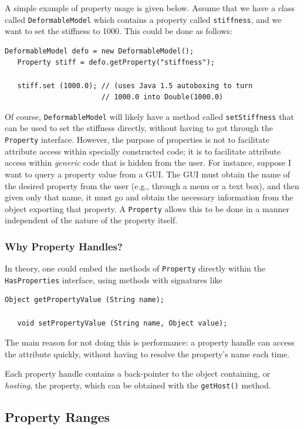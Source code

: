 \documentclass{article}
\begin{document}
A simple example of property usage is given below. Assume that we have
a class called {\tt DeformableModel} which contains a property called
{\tt stiffness}, and we want to set the stiffness to 1000. This
could be done as follows:
\begin{lstlisting}[]
   DeformableModel defo = new DeformableModel();    
   Property stiff = defo.getProperty("stiffness");

   stiff.set (1000.0); // (uses Java 1.5 autoboxing to turn
                       // 1000.0 into Double(1000.0)
\end{lstlisting}
Of course, {\tt DeformableModel} will likely have a method called
{\tt setStiffness} that can be used to set the stiffness directly, without
having to got through the {\tt Property} interface.  However, the
purpose of properties is not to facilitate attribute access within
specially constructed code; it is to facilitate attribute access
within {\it generic} code that is hidden from the user. For instance,
suppose I want to query a property value from a GUI. The GUI must
obtain the name of the desired property from the user (e.g., through a
menu or a text box), and then given only that name, it must go and
obtain the necessary information from the object exporting that
property.  A {\tt Property} allows this to be done in a manner
independent of the nature of the property itself.

\subsubsection{Why Property Handles?}

In theory, one could embed the methods of {\tt Property}
directly within the {\tt HasProperties} interface, using
methods with signatures like 
\begin{lstlisting}[]
   Object getPropertyValue (String name);

   void setPropertyValue (String name, Object value);
\end{lstlisting}
The main reason for not doing this is performance: a property handle
can access the attribute quickly, without having to resolve the
property's name each time. 

Each property handle contains a back-pointer to the object containing,
or {\it hosting}, the property, which can be obtained with the 
{\tt getHost()} method.


\label{rangesSec}
\subsection{Property Ranges}
\end{document}
